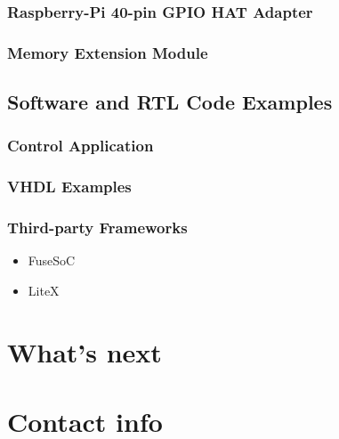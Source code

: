 \begin{frame}
  \frametitle{Raspberry-Pi 40-pin GPIO HAT Adapter}
\end{frame}

\begin{frame}
  \frametitle{Memory Extension Module}
\end{frame}

\subsection{Software and RTL Code Examples}

\begin{frame}
  \frametitle{Control Application}
\end{frame}

\begin{frame}
  \frametitle{VHDL Examples}
\end{frame}

\begin{frame}
  \frametitle{Third-party Frameworks}
  \begin{itemize}
    \item FuseSoC
    \item LiteX
  \end{itemize}
\end{frame}

\section{What's next}

\section{Contact info}



